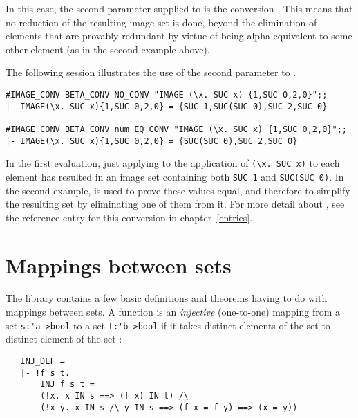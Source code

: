 \noindent In this case, the second parameter supplied to  is
the conversion . This means that no reduction of the resulting
image set is done, beyond the elimination of elements that are provably
redundant by virtue of being alpha-equivalent to some other element (as in the
second example above).

The following session illustrates the use of the second parameter to
.

\begin{session}
\begin{verbatim}
#IMAGE_CONV BETA_CONV NO_CONV "IMAGE (\x. SUC x) {1,SUC 0,2,0}";;
|- IMAGE(\x. SUC x){1,SUC 0,2,0} = {SUC 1,SUC(SUC 0),SUC 2,SUC 0}

#IMAGE_CONV BETA_CONV num_EQ_CONV "IMAGE (\x. SUC x) {1,SUC 0,2,0}";;
|- IMAGE(\x. SUC x){1,SUC 0,2,0} = {SUC(SUC 0),SUC 2,SUC 0}
\end{verbatim}\end{session}

\noindent In the first evaluation, just applying  to the
application of {\small\verb!(\x. SUC x)!} to each element has resulted in an
image set containing both {\small\verb!SUC 1!} and {\small\verb!SUC(SUC 0)!}.
In the second example,  is used to prove these values equal,
and therefore to simplify the resulting set by eliminating one of them from it.
For more detail about , see the reference entry for this
conversion in chapter~\ref{entries}.%

\section{Mappings between sets}

The  library contains a few basic definitions and theorems
having to do with mappings between sets.  A function  is an {\it
injective\/} (one-to-one) mapping from a set {\small\verb!s:'a->bool!} to a set
{\small\verb!t:'b->bool!} if it takes distinct elements of the set  to
distinct element of the set :

\begin{hol}
\begin{verbatim}
   INJ_DEF =
   |- !f s t.
       INJ f s t =
       (!x. x IN s ==> (f x) IN t) /\
       (!x y. x IN s /\ y IN s ==> (f x = f y) ==> (x = y))
\end{verbatim}\end{hol}

